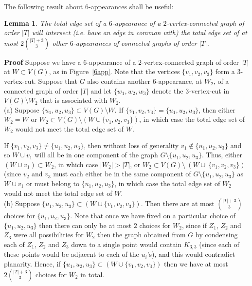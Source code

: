 \documentclass{article}
\newtheorem{Lemma}[Theorem]{Lemma}
\newtheorem{Proof of Theorem}{Proof of Theorem}
\begin{document}
The following result about $6$-appearances shall be useful:















\begin{Lemma} \label{sub1}
The total edge set of a $6$-appearance of a $2$-vertex-connected graph of order $|T|$
will intersect (i.e. have an edge in common with)
the total edge set of at most 
$2 \left( ^{|T|+3} _{\phantom{qw}3} \right)$ other $6$-appearances of connected graphs of order $|T|$.
\end{Lemma}
\textbf{Proof}
Suppose we have a $6$-appearance of a $2$-vertex-connected graph of order $|T|$ at $W \subset V(G)$, 
as in Figure~\ref{6app}.
Note that the vertices $\{ v_{1}, v_{2}, v_{3} \}$ form a $3$-vertex-cut.
Suppose that $G$ also contains another $6$-appearance, at $W_{2}$, of a connected graph of order $|T|$
and let $\{ w_{1}, w_{2}, w_{3} \}$ 
denote the $3$-vertex-cut in $V(G) \setminus W_{2}$ that is associated with $W_{2}$. \\

(a) Suppose $\{ u_{1}, u_{2}, u_{3} \} \subset V(G) \setminus W$.
If $\{ v_{1}, v_{2}, v_{3} \} = \{ u_{1}, u_{2}, u_{3} \}$,
then either $W_{2} = W$ or $W_{2} \subset V(G) \setminus (W \cup \{ v_{1}, v_{2}, v_{3} \})$,
in which case the total edge set of $W_{2}$ would not meet the total edge set of $W$.

If $\{ v_{1}, v_{2}, v_{3} \} \neq \{ u_{1}, u_{2}, u_{3} \}$,
then without loss of generality $v_{1} \notin \{ u_{1}, u_{2}, u_{3} \}$ 
and so 
$W \cup v_{1}$ will all be in one component of the graph $G \setminus \{ u_{1},u_{2},u_{3} \}$.
Thus, either $(W \cup v_{1}) \subset W_{2}$,
in which case $|W_{2}|>|T|$,
or $W_{2} \subset V(G) \setminus~(W \cup~\{ v_{1}, v_{2}, v_{3} \})$
(since $v_{2}$ and $v_{3}$ must each either be in the same component of $G \setminus \{ u_{1},u_{2},u_{3} \}$
as $W \cup v_{1}$ or must belong to $\{ u_{1},u_{2},u_{3} \}$,
in which case the total edge set of $W_{2}$ would not meet the total edge set of $W$. \\

(b) Suppose $\{ u_{1}, u_{2}, u_{3} \} \subset (W \cup \{ v_{1}, v_{2}, v_{3} \})$.
Then there are at most $\left( ^{|T|+3} _{\phantom{qw}3} \right)$ choices for $\{ u_{1}, u_{2}, u_{3} \}$.
Note that once we have fixed on a particular choice of $\{ u_{1},u_{2},u_{3} \}$
then there can only be at most $2$ choices for $W_{2}$,
since if $Z_{1}$, $Z_{2}$ and $Z_{3}$ were all possibilities for $W_{2}$
then the graph obtained from $G$ by condensing each of $Z_{1}$, $Z_{2}$ and $Z_{3}$
down to a single point
would contain $K_{3,3}$
(since each of these points would be adjacent to each of the $u_{i}$'s),
and this would contradict planarity.
Hence,
if $\{ u_{1}, u_{2}, u_{3} \} \subset (W \cup \{ v_{1}, v_{2}, v_{3} \})$
then we have at most~$2 \left( ^{|T|+3} _{\phantom{qw}3} \right)$ choices for $W_{2}$ in total. \\
\end{document}
